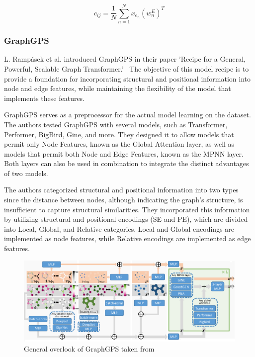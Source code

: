 \begin{equation}
    c_{ij} = \frac{1}{N} \sum_{n=1}^{N} x_{e_n}(w_n^E)^T
    \label{eqn:bias_2}
\end{equation}

\subsubsection{GraphGPS}
\label{sec:graphgps}
L. Rampásek et al. introduced GraphGPS in their paper 'Recipe for a General, Powerful, Scalable Graph Transformer.'~\cite{2023graphgps} The objective of this model recipe is to provide a foundation for incorporating structural and positional information into node and edge features, while maintaining the flexibility of the model that implements these features.

GraphGPS serves as a preprocessor for the actual model learning on the dataset. The authors tested GraphGPS with several models, such as Transformer, Performer, BigBird, Gine, and more. They designed it to allow models that permit only Node Features, known as the Global Attention layer, as well as models that permit both Node and Edge Features, known as the MPNN layer. Both layers can also be used in combination to integrate the distinct advantages of two models.

The authors categorized structural and positional information into two types since the distance between nodes, although indicating the graph's structure, is insufficient to capture structural similarities. They incorporated this information by utilizing structural and positional encodings (SE and PE), which are divided into Local, Global, and Relative categories. Local and Global encodings are implemented as node features, while Relative encodings are implemented as edge features.

\begin{figure}[ht!]
    \centering
    \includegraphics[scale=0.13]{tex/res/gps_abstract.png}
    \caption{General overlook of GraphGPS taken from~\cite{2023graphgps}}
    \label{fig:gps-abstract}
\end{figure}

